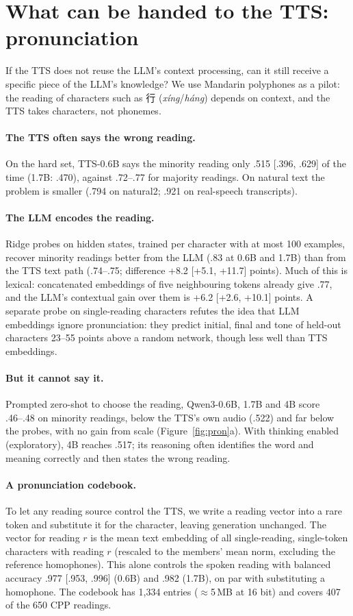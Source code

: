 \documentclass[11pt]{article}
\newcommand{\zh}[1]{#1}
\newcommand{\zh}[1]{\begin{CJK*}{UTF8}{gbsn}#1\end{CJK*}}
\begin{document}
\section{What can be handed to the TTS: pronunciation}
\label{sec:pron}

If the TTS does not reuse the LLM's context processing, can it still receive a specific piece of the LLM's knowledge? We use Mandarin polyphones as a pilot: the reading of characters such as \zh{行} (\emph{x\'ing}/\emph{h\'ang}) depends on context, and the TTS takes characters, not phonemes.

\paragraph{The TTS often says the wrong reading.} On the hard set, TTS-0.6B says the minority reading only .515 [.396, .629] of the time (1.7B: .470), against .72--.77 for majority readings. On natural text the problem is smaller (.794 on natural2; .921 on real-speech transcripts).

\paragraph{The LLM encodes the reading.} Ridge probes on hidden states, trained per character with at most 100 examples, recover minority readings better from the LLM (.83 at 0.6B and 1.7B) than from the TTS text path (.74--.75; difference +8.2 [+5.1, +11.7] points). Much of this is lexical: concatenated embeddings of five neighbouring tokens already give .77, and the LLM's contextual gain over them is +6.2 [+2.6, +10.1] points. A separate probe on single-reading characters refutes the idea that LLM embeddings ignore pronunciation: they predict initial, final and tone of held-out characters 23--55 points above a random network, though less well than TTS embeddings.

\paragraph{But it cannot say it.} Prompted zero-shot to choose the reading, Qwen3-0.6B, 1.7B and 4B score .46--.48 on minority readings, below the TTS's own audio (.522) and far below the probes, with no gain from scale (Figure~\ref{fig:pron}a). With thinking enabled (exploratory), 4B reaches .517; its reasoning often identifies the word and meaning correctly and then states the wrong reading.

\paragraph{A pronunciation codebook.} To let any reading source control the TTS, we write a reading vector into a rare token and substitute it for the character, leaving generation unchanged. The vector for reading $r$ is the mean text embedding of all single-reading, single-token characters with reading $r$ (rescaled to the members' mean norm, excluding the reference homophones). This alone controls the spoken reading with balanced accuracy .977 [.953, .996] (0.6B) and .982 (1.7B), on par with substituting a homophone. The codebook has 1{,}334 entries ($\approx$5\,MB at 16 bit) and covers 407 of the 650 CPP readings.
\end{document}
